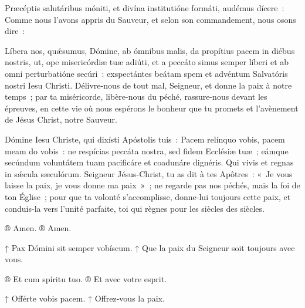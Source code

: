 \vspace{0.2cm}

\begin{paracol}{2}

\LigneParacol{0cm}
{Præcéptis salutáribus móniti, et divína institutióne formáti, audémus dícere~:}
{Comme nous l'avons appris du Sauveur, et selon son commandement, nous osons dire~:}

\end{paracol}


\begin{paracol}{2}

\LigneParacol{0cm}
{Líbera nos, quǽsumus, Dómine, ab ómnibus malis, da propítius pacem in diébus nostris, ut, ope misericórdiæ tuæ adiúti, et a peccáto simus semper líberi et ab omni perturbatióne secúri~: exspectántes beátam spem et advéntum Salvatóris nostri Iesu Christi.}
{Délivre-nous de tout mal, Seigneur, et donne la paix à notre temps~; par ta miséricorde, libère-nous du péché, rassure-nous devant les épreuves, en cette vie où nous espérons le bonheur que tu promets et l'avènement de Jésus Christ, notre Sauveur.}

\end{paracol}


\begin{paracol}{2}

\LigneParacol{0cm}
{Dómine Iesu Christe, qui dixísti Apóstolis tuis~: Pacem relínquo vobis, pacem meam do vobis~: ne respícias peccáta nostra, sed fidem Ecclésiæ tuæ~; eámque secúndum voluntátem tuam pacificáre et coadunáre dignéris. Qui vivis et regnas in sǽcula sæculórum.}
{Seigneur Jésus-Christ, tu as dit à tes Apôtres~: «~Je vous laisse la paix, je vous donne ma paix~»~; ne regarde pas nos péchés, mais la foi de ton Église~; pour que ta volonté s’accomplisse, donne-lui toujours cette paix, et conduis-la vers l’unité parfaite, toi qui règnes pour les siècles des siècles.}

\LigneParacol{0cm}
{® Amen.\vspace{0.2cm}}
{® Amen.\vspace{0.2cm}}

\LigneParacol{0cm}
{↑ Pax Dómini sit semper vobíscum.}
{↑ Que la paix du Seigneur soit toujours avec vous.}

\LigneParacol{0cm}
{® Et cum spíritu tuo.\vspace{0.2cm}}
{® Et avec votre esprit.\vspace{0.2cm}}

\LigneParacol{0cm}
{↑ Offérte vobis pacem.}
{↑ Offrez-vous la paix.}

\end{paracol}
